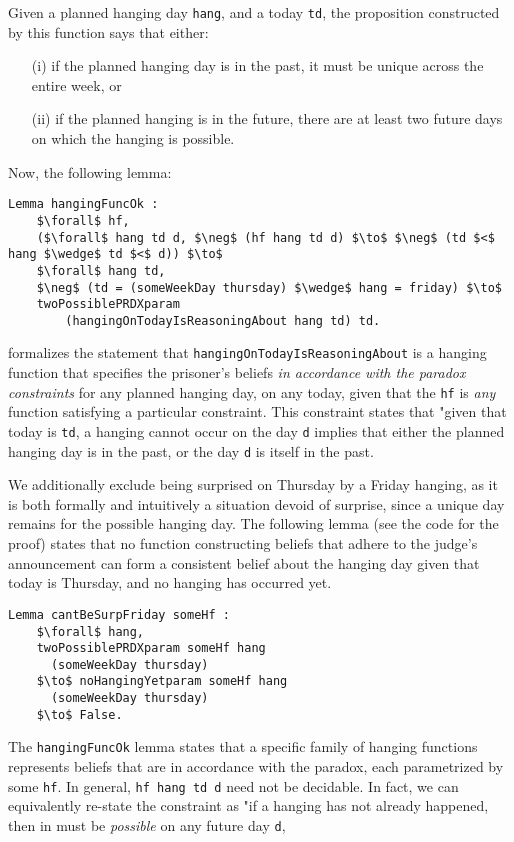 \documentclass[runningheads]{llncs}
\begin{document}
Given a planned hanging day {\tt hang}, and a today {\tt td}, the proposition
constructed by this function says that either:

\begin{itemize}
  \item[(i)] if the planned hanging day is in the past, it must be unique across
  the entire week, or
  \item[(ii)] if the planned hanging is in the future, there are at least two
  future days on which the hanging is possible.
\end{itemize}

Now, the following lemma:

\begin{lstlisting}[mathescape=true]
Lemma hangingFuncOk :
    $\forall$ hf,
    ($\forall$ hang td d, $\neg$ (hf hang td d) $\to$ $\neg$ (td $<$ hang $\wedge$ td $<$ d)) $\to$
    $\forall$ hang td,
    $\neg$ (td = (someWeekDay thursday) $\wedge$ hang = friday) $\to$
    twoPossiblePRDXparam
        (hangingOnTodayIsReasoningAbout hang td) td.
\end{lstlisting}

formalizes the statement that {\tt hangingOnTodayIsReasoningAbout}
is a hanging function that specifies the prisoner's beliefs \emph{in accordance with
the paradox constraints} for any planned hanging day, on any today, given that
the {\tt hf} is \emph{any} function satisfying a particular constraint.
This constraint states that "given that today is {\tt td}, a hanging
cannot occur on
the day {\tt d} implies that either the planned hanging day is in the past, or the day
{\tt d} is itself in the past.

We additionally exclude being surprised
on Thursday by a Friday hanging, as it is both formally and intuitively a
situation devoid
of surprise, since a unique day remains for the possible hanging day.
The following lemma (see the code for the proof) states that no
function constructing beliefs
that adhere to the judge's announcement can form a consistent belief
about the hanging day given that today is Thursday, and no hanging has occurred yet.

\begin{lstlisting}[mathescape=true]
  Lemma cantBeSurpFriday someHf :
    $\forall$ hang,
    twoPossiblePRDXparam someHf hang
      (someWeekDay thursday)
    $\to$ noHangingYetparam someHf hang
      (someWeekDay thursday)
    $\to$ False.
\end{lstlisting}

The {\tt hangingFuncOk} lemma states that a specific family of hanging functions
represents beliefs that
are in accordance with the paradox, each parametrized by some {\tt hf}.
In general, {\tt hf hang td d} need not be
decidable. In fact, we can equivalently re-state
the constraint as "if a hanging has not already happened, then in must be
\emph{possible} on any future day {\tt d},
\end{document}
